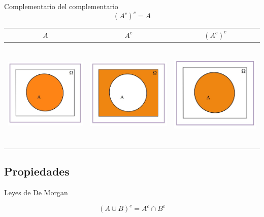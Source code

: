 \documentclass[]{book}
\begin{document}
 Complementario del complementario
\[(A^c)^c=A\]

\begin{longtable}[]{@{}ccc@{}}
\toprule
\(A\) & \(A^c\) & \((A^c)^c\)\tabularnewline
\midrule
\endhead
\includegraphics[width=\textwidth,height=2.08333in]{Images/proba1dibujos/dd2.jpg} & \includegraphics[width=\textwidth,height=2.08333in]{Images/proba1dibujos/dd1.jpg} & \includegraphics[width=\textwidth,height=2.08333in]{Images/proba1dibujos/dd3.jpg}\tabularnewline
\bottomrule
\end{longtable}

\hypertarget{propiedades-4}{%
\subsection{Propiedades}\label{propiedades-4}}

Leyes de De Morgan

\[(A\cup B)^c=A^c\cap B^c\]
\end{document}
